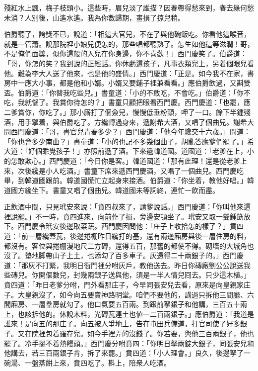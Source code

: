 \begin{myquote} 
殘紅水上飄，梅子枝頭小。這些時，眉兒淡了誰描？因春帶得愁來到，春去緣何愁未消？人別後，山遙水遙。我為你數歸期，畫損了掠兒稍。
\end{myquote} 

伯爵聽了，誇獎不已，說道：「相這大官兒，不在了與他碗飯吃。你看他這喉音，就是一管蕭。說那院裡小娘兒便怎的，那些唱都聽熟了。怎生如他這等滋潤！哥，不是俺們面獎，似你這般的人兒在你身邊，你不喜歡！」西門慶笑了。伯爵道：「哥，你怎的笑？我到說的正經話。{}你休虧這孩子，凡事衣類兒上，另着個眼兒看他。難為李大人送了他來，也是他的盛情。」西門慶道：「正是。如今我不在家，書房中一應大小事，都是他和小婿。小婿又要鋪子裡兼看看。」應伯爵飲過，又斟雙盃。伯爵道：「你替我吃些兒。」書童道：「小的不敢吃，不會吃。」伯爵道：「你不吃，我就惱了。我賞你待怎的？」書童只顧把眼看西門慶。西門慶道：「也罷，應二爹賞你，你吃了。」那小厮打了個僉兒，慢慢低垂粉頸，呷了一口。餘下半鍾殘酒，用手擎着，與伯爵吃了。方纔轉過身來，遞謝希大酒，又唱了個曲兒。謝希大問西門慶道：「哥，書官兒青春多少？」西門慶道：「他今年纔交十六歲。」問道：「你也會多少南曲？」書童道：「小的也記不多幾個曲子，胡亂答應爹們罷了。」希大道：「好個乖覺孩子！」亦照前遞了酒。下來遞韓道國。道國道：「老爹在上，小的怎敢欺心。」西門慶道：「今日你是客。」韓道國道：「那有此理！還是從老爹上來，次後纔是小人吃酒。」書童下席來遞西門慶酒，又唱了一個曲兒。西門慶吃畢，到韓道國跟前。韓道國慌忙立起身來接酒。伯爵道：「你坐着，教他好唱。」韓道國方纔坐下。書童又唱了個曲兒。韓道國未等詞終，連忙一飲而盡。

正飲酒中間，只見玳安來說：「賁四叔來了，請爹說話。」西門慶道：「你叫他來這裡說罷。」不一時，賁四進來，向前作了揖，旁邊安頓坐了。玳安又取一雙鍾筯放下。西門慶令玳安後邊取菜蔬。西門慶因問他：「庄子上收拾怎的樣了？」賁四道：「前一層纔蓋瓦，後邊捲棚昨日纔打的基，還有兩邊廂房與後一層住房的料，都沒有。客位與捲棚漫地尺二方磚，還得五百，那舊的都使不得。砌墻的大城角也沒了。墊地脚帶山子上土，也添勾了百多車子。灰還得二十兩銀子的。」西門慶道：「那灰不打緊，我明日衙門裡分咐灰戶，教他送去。昨日你磚廠劉公公說送我些磚兒。你開個數兒，封幾兩銀子送與他，須是一半人情兒囘去。只少這木植。」賁四道：「昨日老爹分咐，門外看那庄子，今早同張安兒去看，原來是向皇親家庄子。大皇親沒了，如今向五要賣神路明堂。咱們不要他的，講過只拆他三間廳、六間廂房、一層羣房就勾了。他口氣要五百兩。到跟前拏銀子和他講，三百五十兩上，也該拆他的。休說木料，光磚瓦連土也値一二百兩銀子。」應伯爵道：「我道是誰來！是向五的那庄子。向五被人爭地土，告在屯田兵備道，打官司使了好多銀子。又在院裡包着羅存兒。如今手裡弄的沒錢了。你若要，與他三百兩銀子，他也罷了。冷手撾不着熱饅頭。」西門慶分咐賁四：「你明日拏兩錠大銀子，同張安兒和他講去，若三百兩銀子肯，拆了來罷。」賁四道：「小人理會。」良久，後邊拏了一碗湯、一盤蒸餅上來，賁四吃了。斟上，陪衆人吃酒。

